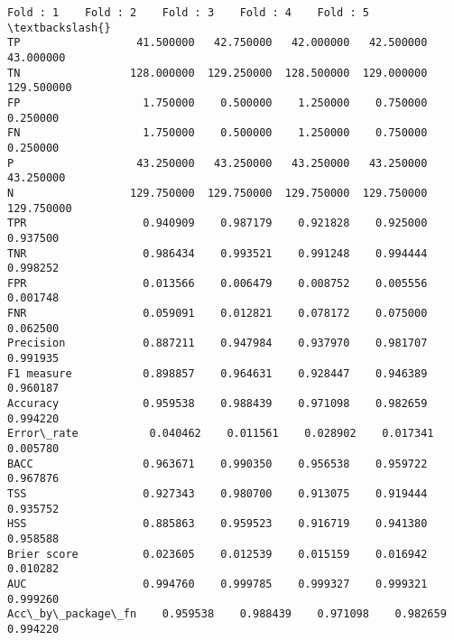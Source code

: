 \documentclass[11pt]{article}
\makeatletter
\newcommand{\boxspacing}{\kern\kvtcb@left@rule\kern\kvtcb@boxsep}
\newcommand{\prompt}[4]{
        {\ttfamily\llap{{\color{#2}[#3]:\hspace{3pt}#4}}\vspace{-\baselineskip}}
    }
\makeatother
\begin{document}
            \begin{tcolorbox}[breakable, size=fbox, boxrule=.5pt, pad at break*=1mm, opacityfill=0]
\prompt{Out}{outcolor}{18}{\boxspacing}
\begin{Verbatim}[commandchars=\\\{\}]
                     Fold : 1    Fold : 2    Fold : 3    Fold : 4    Fold : 5  \textbackslash{}
TP                  41.500000   42.750000   42.000000   42.500000   43.000000
TN                 128.000000  129.250000  128.500000  129.000000  129.500000
FP                   1.750000    0.500000    1.250000    0.750000    0.250000
FN                   1.750000    0.500000    1.250000    0.750000    0.250000
P                   43.250000   43.250000   43.250000   43.250000   43.250000
N                  129.750000  129.750000  129.750000  129.750000  129.750000
TPR                  0.940909    0.987179    0.921828    0.925000    0.937500
TNR                  0.986434    0.993521    0.991248    0.994444    0.998252
FPR                  0.013566    0.006479    0.008752    0.005556    0.001748
FNR                  0.059091    0.012821    0.078172    0.075000    0.062500
Precision            0.887211    0.947984    0.937970    0.981707    0.991935
F1 measure           0.898857    0.964631    0.928447    0.946389    0.960187
Accuracy             0.959538    0.988439    0.971098    0.982659    0.994220
Error\_rate           0.040462    0.011561    0.028902    0.017341    0.005780
BACC                 0.963671    0.990350    0.956538    0.959722    0.967876
TSS                  0.927343    0.980700    0.913075    0.919444    0.935752
HSS                  0.885863    0.959523    0.916719    0.941380    0.958588
Brier score          0.023605    0.012539    0.015159    0.016942    0.010282
AUC                  0.994760    0.999785    0.999327    0.999321    0.999260
Acc\_by\_package\_fn    0.959538    0.988439    0.971098    0.982659    0.994220


\end{Verbatim}
\end{tcolorbox}
\end{document}
